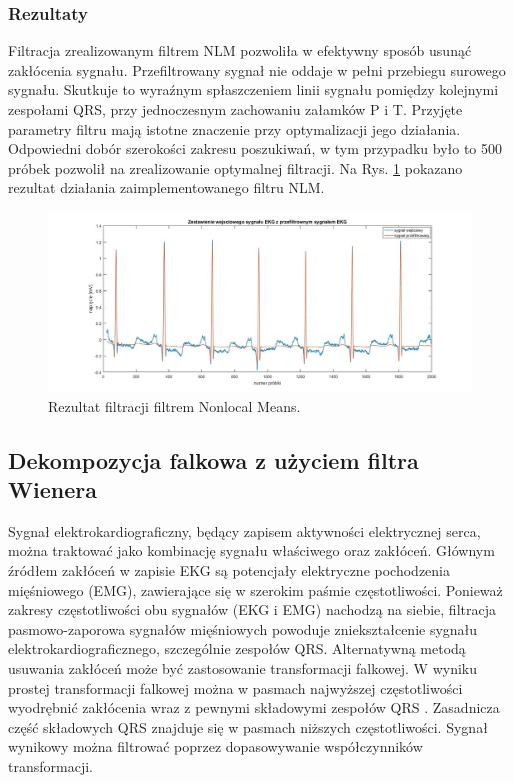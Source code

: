 \documentclass[a4paper]{article}
\begin{document}
\subsubsection{Rezultaty}

Filtracja zrealizowanym filtrem NLM pozwoliła w efektywny sposób usunąć zakłócenia sygnału. Przefiltrowany sygnał nie oddaje w pełni przebiegu surowego sygnału. Skutkuje to wyraźnym spłaszczeniem linii sygnału pomiędzy kolejnymi zespołami QRS, przy jednoczesnym zachowaniu załamków P i T. Przyjęte parametry filtru mają istotne znaczenie przy optymalizacji jego działania. Odpowiedni dobór szerokości zakresu poszukiwań, w tym przypadku było to 500 próbek pozwolił na zrealizowanie optymalnej filtracji. Na Rys. \ref{nlm/zestawienie2} pokazano rezultat działania zaimplementowanego filtru NLM.

\begin{figure}[H]
\centering
\includegraphics[width=\linewidth]{nlm/zestawienie2}
\caption{\label{nlm/zestawienie2}  Rezultat filtracji filtrem Nonlocal Means.}
\end{figure}



\subsection{Dekompozycja falkowa z użyciem filtra Wienera}

Sygnał elektrokardiograficzny, będący zapisem aktywności elektrycznej serca, można traktować jako kombinację sygnału właściwego oraz zakłóceń. Głównym źródłem zakłóceń w zapisie EKG są potencjały elektryczne pochodzenia mięśniowego (EMG), zawierające się w szerokim paśmie częstotliwości. Ponieważ zakresy częstotliwości obu sygnałów (EKG i EMG) nachodzą na siebie, filtracja pasmowo-zaporowa sygnałów mięśniowych powoduje zniekształcenie sygnału elektrokardiograficznego, szczególnie zespołów QRS. Alternatywną metodą usuwania zakłóceń może być zastosowanie transformacji falkowej. W wyniku prostej transformacji falkowej można w pasmach najwyższej częstotliwości wyodrębnić zakłócenia wraz z pewnymi składowymi zespołów QRS \cite{smital}. Zasadnicza część składowych QRS znajduje się w pasmach niższych częstotliwości. Sygnał wynikowy można filtrować poprzez dopasowywanie współczynników transformacji. 
\end{document}
